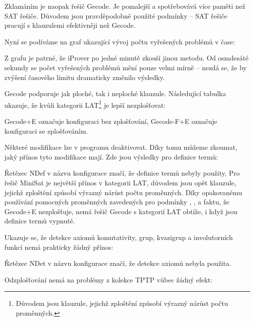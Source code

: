 Zklamáním je naopak řešič Gecode. Je pomalejší a spotřebovává více
paměti než SAT řešiče. Důvodem jsou pravděpodobně použité podmínky
--  SAT řešiče pracují s klauzulemi efektivněji než Gecode.

\newpage

Nyní se podíváme na graf ukazující vývoj počtu vyřešených problémů
v čase:


Z grafu je patrné, že iProver po jedné minutě zkouší jinou metodu.
Od osmdesáté sekundy se počet vyřešených problémů mění pouze velmi
mírně -- nezdá se, že by zvýšení časového limitu dramaticky změnilo
výsledky.

\newpage

Gecode podporuje jak ploché, tak i neploché klauzule.
Následující tabulka ukazuje, že kvůli kategorii LAT\footnote{Důvodem
jsou klauzule, jejichž zploštění způsobí výrazný nárůst počtu proměnných.}
je lepší nezplošťovat:


Gecode+E označuje konfiguraci bez zplošťování,
Gecode-F+E označuje konfiguraci se zplošťováním.

\newpage

Některé modifikace lze v programu \crossbow{} deaktivovat.
Díky tomu můžeme zkoumat, jaký přínos tyto modifikace mají.
Zde jsou výsledky pro definice termů:


Řetězec NDef v názvu konfigurace značí, že
definice termů nebyly použity. Pro řešič MiniSat
je největší přínos v kategorii LAT, důvodem
jsou opět klauzule, jejichž zploštění způsobí
výrazný nárůst počtu proměnných.
Díky opakovanému používání pomocných proměnných zavedených
pro podmínky \Linear{}, \Element{}, \Eq{}
a faktu, že Gecode+E nezplošťuje, nemá řešič Gecode
s kategorií LAT obtíže, i když jsou definice termů vypnuté.

\newpage

Ukazuje se, že detekce axiomů komutativity,
grup, kvazigrup a involutorních funkcí nemá prakticky
žádný přínos:


Řetězec NDet v názvu konfigurace značí, že
detekce axiomů nebyla použita.

\newpage

Odzplošťování nemá na problémy z kolekce TPTP vůbec žádný efekt:


